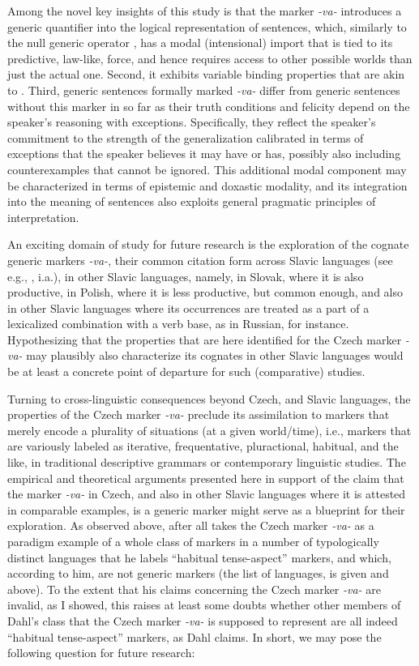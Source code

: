 \documentclass[output=paper,colorlinks,citecolor=brown]{langscibook}
\begin{document}
Among the novel key insights of this study is that
the marker \textit{-va-} introduces a generic quantifier into the logical representation of sentences, which, similarly to the null generic operator ,
has a modal (intensional) import that is tied to its predictive, law-like, force, and hence requires access to other possible worlds than just the actual one. Second, it exhibits variable binding properties that are akin to .
Third, generic sentences formally marked \textit{-va-} differ from generic sentences without this marker
in so far as their truth conditions and felicity depend on the speaker's reasoning with exceptions. Specifically, they reflect the speaker's commitment
to the strength of the generalization calibrated in terms of exceptions that the speaker believes it may have or has, possibly also including counterexamples that cannot be ignored.
This additional modal component  may be characterized in terms of epistemic and doxastic modality, and its integration into the meaning of sentences also exploits general pragmatic principles of interpretation.

An exciting domain of study for future research is
the exploration of the cognate generic markers \textit{-va-}, their
common citation form across Slavic languages (see e.g., \citealt{Genis2021}, i.a.), in other Slavic languages, namely, in Slovak, where it is also
productive, in Polish, where it is less productive, but
common enough, and also in other Slavic languages where its occurrences
are treated as a part of a lexicalized combination with a verb base,
as in Russian, for instance. Hypothesizing that the properties
that are here identified for the Czech marker \textit{-va-} may plausibly
also characterize its cognates in other Slavic languages would
be at least a concrete point of departure for such (comparative) studies.

Turning to cross-linguistic consequences beyond Czech, and Slavic languages,
the properties of the Czech marker \textit{-va-} preclude its assimilation
to markers
that merely encode a plurality of situations (at a given world/time), i.e., markers that are variously labeled as iterative, frequentative, pluractional, habitual, and the like, in traditional descriptive grammars or contemporary linguistic studies.
The empirical and theoretical arguments presented here in support of the claim that the marker
\textit{-va-} in Czech, and also in other Slavic languages where it is attested in comparable examples, is a generic marker might serve as a blueprint for their exploration.
As observed above, \citet{dahl1995} after all takes
the Czech marker \textit{-va-} as a paradigm example of a whole class of markers
in a number of typologically distinct languages that he labels ``habitual tense-aspect'' markers,
and which, according to him, are not generic markers (the list of languages, is given \citet [421,~fn.~8]{dahl1995} and above).
To the extent that his claims concerning the Czech marker \textit{-va-} are invalid, as I showed, this raises at least some doubts whether
other members of Dahl's class that the Czech marker \textit{-va-} is supposed to represent are all indeed ``habitual tense-aspect'' markers, as Dahl claims.
In short, we may pose the following question for future research:
\end{document}
